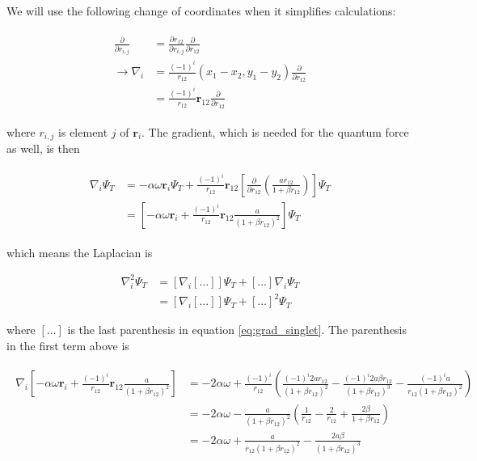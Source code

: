 \documentclass[english, a4paper]{article}
\newcommand{\bm}[1]{\mathbf{#1}}
\begin{document}
	We will use the following change of coordinates when it simplifies calculations:
	
	\begin{align}
	\begin{split}
	\frac{\partial}{\partial r_{i,j}} &= \frac{\partial r_{12}}{\partial r_{i,j}}\frac{\partial}{\partial r_{12}}\\
	\rightarrow \nabla_i &= \frac{(-1)^i}{r_{12}}(x_1-x_2, y_1-y_2)\frac{\partial}{\partial r_{12}}\\
	&= \frac{(-1)^i}{r_{12}}\bm{r}_{12}\frac{\partial}{\partial r_{12}}
	\end{split}
	\label{eq:coord_change_nabla}
	\end{align}
	
	where $r_{i,j}$ is element $j$ of $\bm{r}_i$.
	The gradient, which is needed for the quantum force as well, is then
	
	\begin{align}
	\begin{split}
	\nabla_i\Psi_T &= -\alpha\omega\bm{r}_i\Psi_T + \frac{(-1)^i}{r_{12}}\bm{r}_{12}\left[\frac{\partial}{\partial r_{12}}\left(\frac{ar_{12}}{1+\beta r_{12}}\right)\right]\Psi_T\\
	&= \left[-\alpha\omega\bm{r}_i + \frac{(-1)^i}{r_{12}}\bm{r}_{12}\frac{a}{(1+\beta r_{12})^2}\right]\Psi_T
	\end{split}
	\label{eq:grad_singlet}
	\end{align} 
	
	which means the Laplacian is
	
	\begin{equation}
	\begin{split}
	\nabla_i^2\Psi_T &= \left[\nabla_i[\ldots]\right]\Psi_T + [\ldots]\nabla_i\Psi_T\\
	&= \left[\nabla_i[\ldots]\right]\Psi_T + [\ldots]^2\Psi_T
	\end{split}
	\end{equation}
	
	where $[\ldots]$ is the last parenthesis in equation \ref{eq:grad_singlet}. The parenthesis in the first term above is
	
	\begin{align}
	\begin{split}
	\nabla_i\left[-\alpha\omega\bm{r}_i + \frac{(-1)^i}{r_{12}}\bm{r}_{12}\frac{a}{(1+\beta r_{12})^2}\right] &= -2\alpha\omega + \frac{(-1)^i}{r_{12}}\left( \frac{(-1)^i2ar_{12}}{(1+\beta r_{12})^2} - \frac{(-1)^i2a\beta r_{12}}{(1+\beta r_{12})^3} - \frac{(-1)^ia}{r_{12}(1+\beta r_{12})^2}\right)\\
	&= -2\alpha\omega - \frac{a}{(1+\beta r_{12})^2}\left( \frac{1}{r_{12}} - \frac{2}{r_{12}} + \frac{2\beta}{1+\beta r_{12}}\right)\\
	&= -2\alpha\omega + \frac{a}{r_{12}(1+\beta r_{12})^2}- \frac{2a\beta}{(1+\beta r_{12})^3}
	\end{split}
	\end{align}
	
\end{document}
